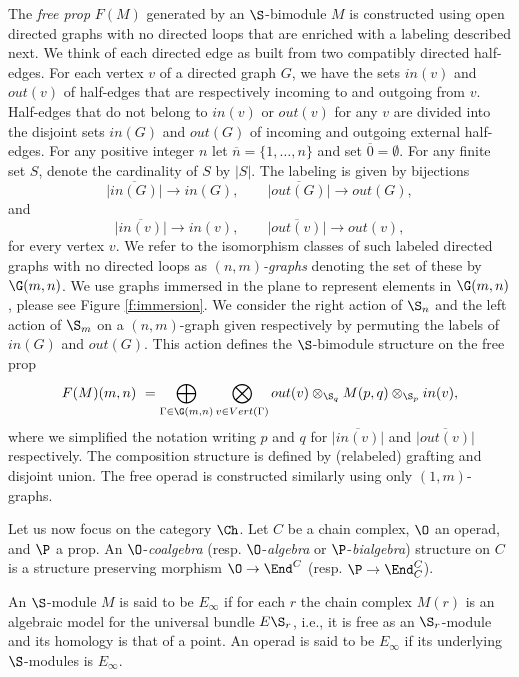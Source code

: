 The \textit{free prop} $F(M)$ generated by an \mbox{$\S$-bimodule} $M$ is constructed using open directed graphs with no directed loops that are enriched with a labeling described next. We think of each directed edge as built from two compatibly directed half-edges. For each vertex $v$ of a directed graph $G$, we have the sets $in(v)$ and $out(v)$ of half-edges that are respectively incoming to and outgoing from $v$. Half-edges that do not belong to $in(v)$ or $out(v)$ for any $v$ are divided into the disjoint sets $in(G)$ and $out(G)$ of incoming and outgoing external half-edges. For any positive integer $n$ let $\overline{n} = \{1,\dots,n\}$ and set $\overline{0} = \emptyset$. For any finite set $S$, denote the cardinality of $S$ by $|S|$. The labeling is given by bijections  
\begin{equation*}
\overline{|in(G)|}\to in(G), \qquad
\overline{|out(G)|}\to out(G),
\end{equation*}
and
\begin{equation*}
\overline{|in(v)|}\to in(v), \qquad
\overline{|out(v)|}\to out(v),
\end{equation*}
for every vertex $v$.
We refer to the isomorphism classes of such labeled directed graphs with no directed loops as $(n,m)$\textit{-graphs} denoting the set of these by $\G(m,n)$.
We use graphs immersed in the plane to represent elements in $\G(m,n)$, please see Figure \ref{f:immersion}.
We consider the right action of $\S_n$ and the left action of $\S_m$ on a $(n,m)$-graph given respectively by permuting the labels of $in(G)$ and $out(G)$. This action defines the $\S$-bimodule structure on the free prop
\begin{equation} \label{e:free prop}
F(M)(m,n) \ = \bigoplus_{\Gamma \in \G(m,n)} \bigotimes_{v \in Vert(\Gamma)} out(v) \otimes_{\S_q} M(p, q) \otimes_{\S_p} in(v),
\end{equation}
where we simplified the notation writing $p$ and $q$ for $\overline{|in(v)|}$ and $\overline{|out(v)|}$ respectively. The composition structure is defined by (relabeled) grafting and disjoint union.
The free operad is constructed similarly using only $(1,m)$-graphs.

Let us now focus on the category $\Ch$.
Let $C$ be a chain complex, $\O$ an operad, and $\P$ a prop.
An $\O$-\textit{coalgebra} (resp. $\O$-\textit{algebra} or $\P$-\textit{bialgebra}) structure on $C$ is a structure preserving morphism $\O \to \End^C$ (resp. $\P \to \End_C^C$).

An $\S$-module $M$ is said to be $E_\infty$ if for each $r$ the chain complex $M(r)$ is an algebraic model for the universal bundle $E\S_r$, i.e., it is free as an $\S_r$-module and its homology is that of a point.
An operad is said to be $E_\infty$ if its underlying $\S$-modules is $E_\infty$.


